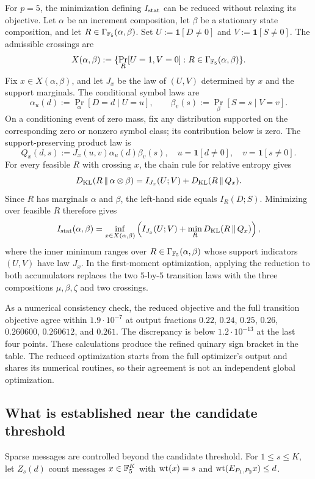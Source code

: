For $p=5$, the minimization defining $I_{\rm stat}$ can be reduced without
relaxing its objective.  Let $\alpha$ be an increment composition, let
$\beta$ be a stationary state composition, and let
$R\in\Gamma_{\mathbb F_5}(\alpha,\beta)$.
Set $U:=\mathbf 1[D\ne0]$ and $V:=\mathbf 1[S\ne0]$. The admissible
crossings are
\[
 X(\alpha,\beta):=\{\Pr_R[U=1,V=0]:R\in\Gamma_{\mathbb F_5}(\alpha,\beta)\}.
\]
Fix $x\in X(\alpha,\beta)$, and let $J_x$ be the law of $(U,V)$
determined by $x$ and the support marginals. The
conditional symbol laws are
\[
 \alpha_u(d):=\Pr_{\alpha}[D=d\mid U=u],
 \qquad
 \beta_v(s):=\Pr_{\beta}[S=s\mid V=v].
\]
On a conditioning event of zero mass, fix any distribution supported on the
corresponding zero or nonzero symbol class; its contribution below is zero.
The support-preserving product law is
\[
 Q_x(d,s):=J_x(u,v)\alpha_u(d)\beta_v(s),
 \quad u=\mathbf 1[d\ne0],\quad v=\mathbf 1[s\ne0].
\]
For every feasible $R$ with crossing $x$, the chain rule for relative entropy
gives
\[
 D_{\rm KL}(R\,\|\,\alpha\otimes\beta)
 =I_{J_x}(U;V)+D_{\rm KL}(R\,\|\,Q_x).
\]
Since $R$ has marginals $\alpha$ and $\beta$, the left-hand side equals
$I_R(D;S)$.  Minimizing over feasible $R$ therefore gives
\[
 I_{\rm stat}(\alpha,\beta)
 =\inf_{x\in X(\alpha,\beta)}\left(I_{J_x}(U;V)
   +\min_R D_{\rm KL}(R\,\|\,Q_x)\right),
\]
where the inner minimum ranges over $R\in\Gamma_{\mathbb F_5}(\alpha,\beta)$ whose
support indicators $(U,V)$ have law $J_x$.  In the first-moment
optimization, applying the reduction to both accumulators replaces the two
$5$-by-$5$ transition laws with the three compositions $\mu,\beta,\zeta$ and
two crossings.

As a numerical consistency check, the reduced objective and the full
transition objective agree within $1.9\cdot10^{-7}$ at output fractions
$0.22$, $0.24$, $0.25$, $0.26$, $0.260600$, $0.260612$, and $0.261$.  The
discrepancy is below $1.2\cdot10^{-13}$ at the last four points.  These
calculations produce the refined quinary sign bracket in the table.  The
reduced optimization starts from the full optimizer's output and shares its
numerical routines, so their agreement is not an independent global
optimization.

\subsection{What is established near the candidate threshold}

Sparse messages are controlled beyond the candidate threshold.  For
$1\le s\le K$, let $Z_s(d)$ count messages $x\in\mathbb F_5^K$ with $\operatorname{wt}(x)=s$ and
$\operatorname{wt}(E_{P_1,P_2}x)\le d$.

